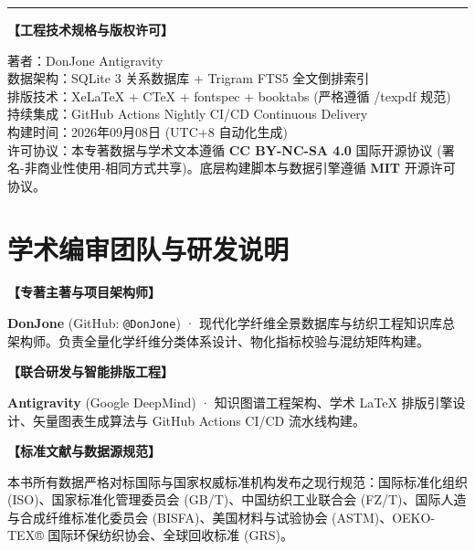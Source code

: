 \documentclass[11pt,openright,twoside,UTF8]{ctexbook}
\begin{document}
\vfill

\begin{center}
\begin{minipage}{0.88\textwidth}
\small
\noindent\rule{\textwidth}{0.5pt}\par
\vspace{0.2cm}
\noindent\textbf{【工程技术规格与版权许可】}\par
\vspace{0.2cm}
\noindent 著\quad\quad 者：DonJone \quad Antigravity\\
\noindent 数据架构：SQLite 3 关系数据库 + Trigram FTS5 全文倒排索引\\
\noindent 排版技术：XeLaTeX + CTeX + fontspec + booktabs (严格遵循 /texpdf 规范)\\
\noindent 持续集成：GitHub Actions Nightly CI/CD Continuous Delivery\\
\noindent 构建时间：2026年09月08日 (UTC+8 自动化生成)\\
\noindent 许可协议：本专著数据与学术文本遵循 \textbf{CC BY-NC-SA 4.0} 国际开源协议 (署名-非商业性使用-相同方式共享)。底层构建脚本与数据引擎遵循 \textbf{MIT} 开源许可协议。
\end{minipage}
\end{center}
\vspace{1.0cm}

\chapter*{学术编审团队与研发说明}

\noindent\textbf{【专著主著与项目架构师】}\par
\noindent \textbf{DonJone} (GitHub: \texttt{@DonJone}) · 现代化学纤维全景数据库与纺织工程知识库总架构师。负责全量化学纤维分类体系设计、物化指标校验与混纺矩阵构建。

\vspace{0.4cm}
\noindent\textbf{【联合研发与智能排版工程】}\par
\noindent \textbf{Antigravity} (Google DeepMind) · 知识图谱工程架构、学术 LaTeX 排版引擎设计、矢量图表生成算法与 GitHub Actions CI/CD 流水线构建。

\vspace{0.4cm}
\noindent\textbf{【标准文献与数据源规范】}\par
\noindent 本书所有数据严格对标国际与国家权威标准机构发布之现行规范：国际标准化组织 (ISO)、国家标准化管理委员会 (GB/T)、中国纺织工业联合会 (FZ/T)、国际人造与合成纤维标准化委员会 (BISFA)、美国材料与试验协会 (ASTM)、OEKO-TEX® 国际环保纺织协会、全球回收标准 (GRS)。
\end{document}
